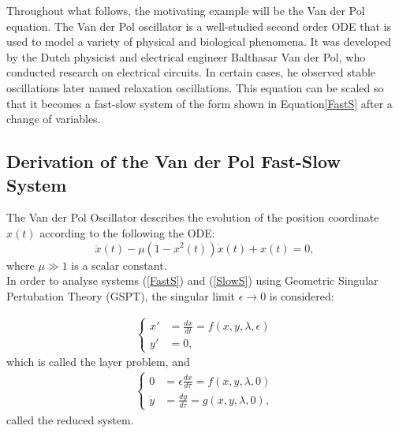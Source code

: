Throughout what follows, the motivating example will be the Van der Pol equation. The Van der Pol oscillator is a well-studied second order ODE that is used to model a variety of physical and biological phenomena. It was developed by the Dutch physicist and electrical engineer Balthasar Van der Pol, who conducted research on electrical circuits. In certain cases, he observed stable oscillations later named relaxation oscillations. This equation can be scaled so that it becomes a fast-slow system of the form shown in Equation\ref{FastS} after a change of variables.

\subsection{Derivation of the Van der Pol Fast-Slow System}

The Van der Pol Oscillator describes the evolution of the position coordinate \(x(t)\) according to the following the ODE:
\begin{equation} \label{eq:vdP}
\ddot{x}(t)-\mu\left(1-x^2(t)\right)\dot{x}(t)+x(t)=0,
\end{equation}
where \(\mu \gg 1\) is a scalar constant. \\

In order to analyse systems (\ref{FastS}) and (\ref{SlowS}) using Geometric Singular Pertubation Theory (GSPT), the singular limit $\epsilon \to 0$ is considered:

\begin{align} \label{FastS0}
\begin{cases}
x' &=\frac{dx}{dt}= f(x,y,\lambda, \epsilon)\\
y' &= 0,
\end{cases}
\end{align}
which is called the layer problem, and
\begin{align}\label{SlowS0}
\begin{cases}
0 &= \epsilon \frac{dx}{d \tau} = f(x,y,\lambda, 0)\\
\dot{y} & = \frac{dy}{d \tau} =  g( x,y, \lambda,0),
\end{cases}
\end{align}
called the reduced system.\\

